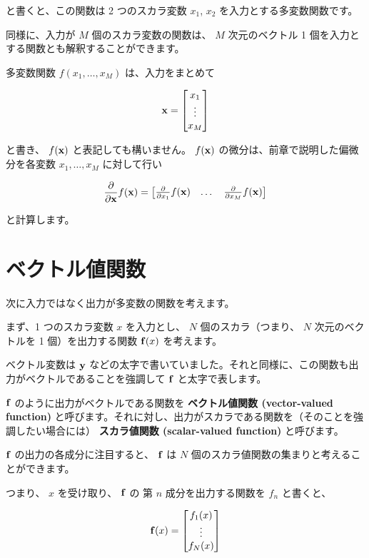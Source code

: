 と書くと、この関数は 2 つのスカラ変数 $x_1$, $x_2$ を入力とする多変数関数です。

同様に、入力が $M$ 個のスカラ変数の関数は、 $M$ 次元のベクトル 1 個を入力とする関数とも解釈することができます。

多変数関数 $f(x_1, \ldots, x_M)$ は、入力をまとめて


\[
{\bf x} = \begin{bmatrix} x_1 \\ \vdots \\ x_M \end{bmatrix}
\]


と書き、 $f({\bf x})$ と表記しても構いません。 $f({\bf x})$ の微分は、前章で説明した偏微分を各変数 $x_1, \ldots, x_M$ に対して行い


\[
\frac{\partial}{\partial {\bf x}} f({\bf x}) =
\begin{bmatrix}
\frac{\partial}{\partial x_1} f({\bf x})  & \dots & \frac{\partial}{\partial x_M} f({\bf x}) \\
\end{bmatrix}
\]


と計算します。


\section{ベクトル値関数}


次に入力ではなく出力が多変数の関数を考えます。

まず、1 つのスカラ変数 $x$ を入力とし、 $N$ 個のスカラ（つまり、 $N$ 次元のベクトルを 1 個）を出力する関数 ${\bf f}(x)$ を考えます。

ベクトル変数は ${\bf y}$ などの太字で書いていました。それと同様に、この関数も出力がベクトルであることを強調して ${\bf f}$ と太字で表します。

${\bf f}$ のように出力がベクトルである関数を \textbf{ベクトル値関数 (vector-valued function)} と呼びます。それに対し、出力がスカラである関数を（そのことを強調したい場合には） \textbf{スカラ値関数 (scalar-valued function)} と呼びます。


${\bf f}$ の出力の各成分に注目すると、 ${\bf f}$ は $N$ 個のスカラ値関数の集まりと考えることができます。

つまり、 $x$ を受け取り、 ${\bf f}$ の 第 $n$ 成分を出力する関数を $f_n$ と書くと、


\[
{\bf f}(x) = \begin{bmatrix}f_1(x) \\ \vdots \\ f_N(x)\end{bmatrix}
\]


